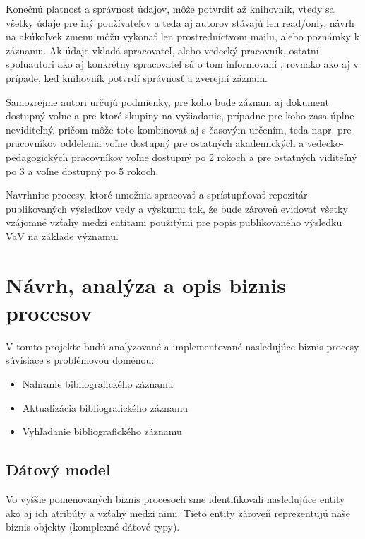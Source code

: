 \documentclass[10pt,oneside,slovak,a4paper]{article}
\begin{document}
Konečnú platnosť a správnosť údajov, môže potvrdiť až knihovník, vtedy sa všetky údaje pre iný používateľov a teda aj autorov stávajú len read/only, návrh na akúkoľvek zmenu môžu vykonať len prostredníctvom mailu, alebo poznámky k záznamu. Ak údaje vkladá spracovateľ, alebo vedecký pracovník, ostatní spoluautori ako aj konkrétny spracovateľ sú o tom informovaní , rovnako ako aj v prípade, keď knihovník potvrdí správnosť a zverejní záznam. 

Samozrejme autori určujú podmienky, pre koho bude záznam aj dokument dostupný voľne a pre ktoré skupiny na vyžiadanie, prípadne pre koho zasa úplne neviditeľný, pričom môže toto kombinovať aj s časovým určením, teda napr. pre pracovníkov oddelenia voľne dostupný pre ostatných akademických a vedecko-pedagogických pracovníkov voľne dostupný po 2 rokoch a pre ostatných viditeľný po 3 a voľne dostupný po 5 rokoch.

Navrhnite procesy, ktoré umožnia spracovať a sprístupňovať repozitár publikovaných výsledkov vedy a výskumu tak, že bude zároveň evidovať všetky vzájomné vzťahy medzi entitami použitými pre popis publikovaného výsledku VaV na základe významu.

\newpage

\section{Návrh, analýza a opis biznis procesov}

V tomto projekte budú analyzované a implementované nasledujúce biznis procesy súvisiace s problémovou doménou:

\begin{itemize}
\item Nahranie bibliografického záznamu
\item Aktualizácia bibliografického záznamu
\item Vyhľadanie bibliografického záznamu
\end{itemize}

\subsection{Dátový model}

Vo vyššie pomenovaných biznis procesoch sme identifikovali nasledujúce entity ako aj ich atribúty a vzťahy medzi nimi. Tieto entity zároveň reprezentujú naše biznis objekty (komplexné dátové typy).
\end{document}
